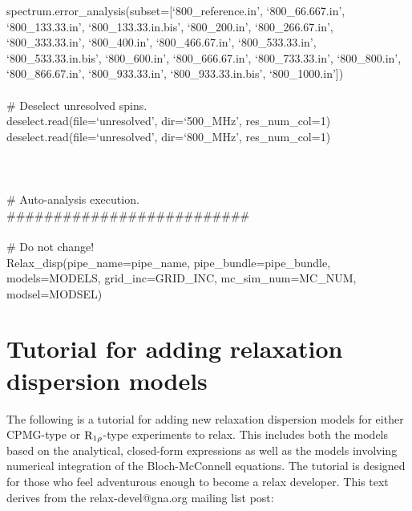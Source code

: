 \begin{exampleenv}
spectrum.error\_analysis(subset=[`800\_reference.in', `800\_66.667.in', `800\_133.33.in', `800\_133.33\linebreak[0]{}.in.bis', `800\_200.in', `800\_266.67.in', `800\_333.33.in', `800\_400.in', `800\_466.67.in', `800\_533\linebreak[0]{}.33.in', `800\_533.33.in.bis', `800\_600.in', `800\_666.67.in', `800\_733.33.in', `800\_800.in', `800\linebreak[0]{}\_866.67.in', `800\_933.33.in', `800\_933.33.in.bis', `800\_1000.in']) \\
 \\
\# Deselect unresolved spins. \\
deselect.read(file=`unresolved', dir=`500\_MHz', res\_num\_col=1) \\
deselect.read(file=`unresolved', dir=`800\_MHz', res\_num\_col=1) \\
 \\
 \\
 \\
\# Auto-analysis execution. \\
\#\#\#\#\#\#\#\#\#\#\#\#\#\#\#\#\#\#\#\#\#\#\#\#\#\# \\
 \\
\# Do not change! \\
Relax\_disp(pipe\_name=pipe\_name, pipe\_bundle=pipe\_bundle, models=MODELS, grid\_inc=GRID\_INC, mc\_sim\linebreak[0]{}\_num=MC\_NUM, modsel=MODSEL) \\
\end{exampleenv}




\section{Tutorial for adding relaxation dispersion models}

The following is a tutorial for adding new relaxation dispersion models for either CPMG-type or $\mathrm{R}_{1\rho}$-type experiments to relax.  This includes both the models based on the analytical, closed-form expressions as well as the models involving numerical integration of the Bloch-McConnell equations.  The tutorial is designed for those who feel adventurous enough to become a relax developer.  This text derives from the relax-devel@gna.org mailing list post:

